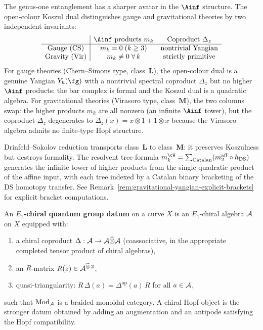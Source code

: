 \begin{remark}%
\label{rem:gauge-gravity-yangian-dichotomy}%
%
The genus-one entanglement has a sharper avatar in the $\Ainf$ structure. The open-colour Koszul dual distinguishes gauge and gravitational theories by two independent invariants:
\[
\begin{array}{c|cc}
& \Ainf\text{ products } m_k & \text{Coproduct } \Delta_z \\
\hline
\text{Gauge (CS)} & m_k = 0 \;(k \ge 3) &
 \text{nontrivial Yangian} \\
\text{Gravity (Vir)} & m_k \neq 0 \;\forall\, k &
 \text{strictly primitive}
\end{array}
\]
For gauge theories (Chern--Simons type, class~$\mathbf{L}$), the open-colour dual is a genuine Yangian $Y_\hbar(\fg)$ with a nontrivial spectral coproduct $\Delta_z$ but no higher $\Ainf$ products: the bar complex is formal and the Koszul dual is a quadratic algebra. For gravitational theories (Virasoro type, class~$\mathbf{M}$), the two columns swap: the higher products $m_k$ are all nonzero (an infinite $\Ainf$ tower), but the coproduct $\Delta_z$ degenerates to $\Delta_z(x) = x \otimes 1 + 1 \otimes x$ because the Virasoro algebra admits no finite-type Hopf structure.

Drinfeld--Sokolov reduction transports class~$\mathbf{L}$ to class~$\mathbf{M}$: it preserves Koszulness but destroys formality. The resolvent tree formula
$m_k^{\cW} = \sum_{\mathrm{Catalan}}(m_2^{\mathrm{aff}}
\circ h_{\mathrm{DS}})$
generates the infinite tower of higher products from the
single quadratic product of the affine input, with each tree
indexed by a Catalan binary bracketing of the DS homotopy transfer.
See Remark~\ref{rem:gravitational-yangian-explicit-brackets}
for explicit bracket computations.
\end{remark}

\begin{definition}%
\label{def:e1-chiral-quantum-group}%
%
%
An \textbf{$E_1$-chiral quantum group datum} on a curve $X$ is an
$E_1$-chiral algebra $\mathcal{A}$ on $X$ equipped with:
\begin{enumerate}
\item a chiral coproduct
 $\Delta : \mathcal{A} \to \mathcal{A} \widehat\otimes \mathcal{A}$
 (coassociative, in the appropriate completed tensor product
 of chiral algebras),
\item an $R$-matrix $R(z) \in \mathcal{A}^{\widehat\otimes\, 2}$,
\item quasi-triangularity:
 $R\,\Delta(a) = \Delta^{\mathrm{op}}(a)\,R$
 for all $a \in \mathcal{A}$,
\end{enumerate}
such that $\mathrm{Mod}_{\mathcal{A}}$ is a braided monoidal category.
A chiral Hopf object is the stronger datum obtained by adding an
augmentation and an antipode satisfying the Hopf compatibility.
\end{definition}


